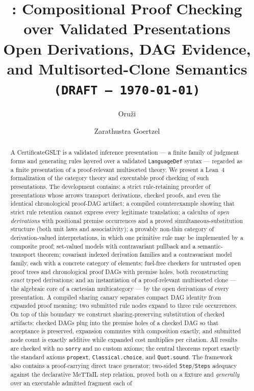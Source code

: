 \documentclass[]{article}
\title{\CertificateGSLT{}: Compositional Proof Checking over Validated \GSLT{} Presentations\\
\large Open Derivations, DAG Evidence, and Multisorted-Clone Semantics\\
\texttt{(DRAFT --- \today)}}
\author{Oru\v{z}i \and Zarathustra Goertzel}
\theoremstyle{remark}
\newcommand{\code}[1]{\texttt{#1}}
\newcommand{\MeTTaIL}{\textup{MeTTaIL}}
\newcommand{\CertificateGSLT}{\textup{CertificateGSLT}}
\begin{document}
\maketitle

\begin{abstract}
A \CertificateGSLT{} is a validated inference presentation --- a finite family of
judgment forms and generating rules layered over a validated
\code{LanguageDef} syntax --- regarded as a finite presentation of a
proof-relevant multisorted theory.  We present a Lean~4 formalization of the
category theory and executable proof checking of such presentations.  The
development contains: a strict rule-retaining preorder of presentations whose
arrows transport derivations, checked proofs, and even the identical
chronological proof-DAG artifact; a compiled counterexample showing that
strict rule retention cannot express every legitimate translation; a calculus
of \emph{open derivations} with positional premise occurrences and a proved
simultaneous-substitution structure (both unit laws and associativity); a
provably non-thin category of derivation-valued interpretations, in which one
primitive rule may be implemented by a composite proof; set-valued models
with contravariant pullback and a semantic-transport theorem; covariant
indexed derivation families and a contravariant model family, each with a
concrete category of elements; fuel-free checkers for untrusted open proof
trees and chronological proof DAGs with premise holes, both reconstructing
\emph{exact} typed derivations; and an instantiation of a proof-relevant
multisorted clone --- the algebraic core of a cartesian multicategory --- by
the open derivations of every presentation.  A compiled sharing canary
separates compact DAG identity from expanded proof meaning: two submitted
rule nodes expand to three rule occurrences.  On top of this boundary we
construct sharing-preserving substitution of checked artifacts: checked
DAGs plug into the premise holes of a checked DAG so that acceptance is
preserved, expansion commutes with composition exactly, and submitted node
count is exactly additive while expanded cost multiplies per citation.
All results are checked with no \code{sorry} and no custom axioms; the
central theorems report exactly the standard axioms \code{propext},
\code{Classical.choice}, and \code{Quot.sound}.  The framework also contains
a proof-carrying direct trace generator; two-sided \code{Step}/\code{Steps}
adequacy against the declarative \MeTTaIL{} step relation, proved both on a
fixture and \emph{generally} over an executable admitted fragment each of

\end{abstract}
\end{document}
